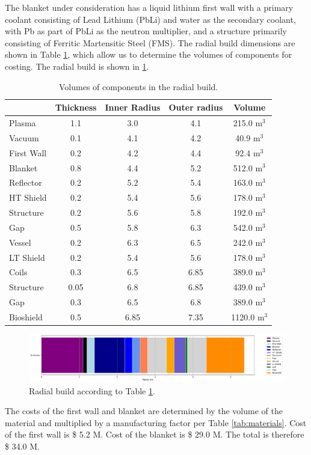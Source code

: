 The blanket under consideration has a liquid lithium first wall with a primary coolant consisting of Lead Lithium (PbLi) and water as the secondary coolant, with Pb as part of PbLi as the neutron multiplier, and a structure primarily consisting of Ferritic Martensitic Steel (FMS). The radial build dimensions are shown in Table \ref{tab:volumes}, which allow us to determine the volumes of components for costing.  The radial build is shown in \ref{fig:radial}.  \\


\begin{table}[h!]
    \centering
    \begin{tabular}{l c  c c c}
    \hline
        &	Thickness	&	Inner Radius	&	Outer radius	&	Volume		\\
        \hline
Plasma	&	1.1	&	3.0	&	4.1	&	215.0	m$^{3}$	\\
Vacuum	&	0.1	&	4.1	&	4.2	&	40.9	m$^{3}$	\\
First Wall	&	0.2	&	4.2	&	4.4	&	92.4	m$^{3}$	\\
Blanket	&	0.8	&	4.4	&	5.2	&	512.0	m$^{3}$	\\
Reflector	&	0.2	&	5.2	&	5.4	&	163.0	m$^{3}$	\\
HT Shield	&	0.2	&	5.4	&	5.6	&	178.0	m$^{3}$	\\
Structure	&	0.2	&	5.6	&	5.8	&	192.0	m$^{3}$	\\
Gap	&	0.5	&	5.8	&	6.3	&	542.0	m$^{3}$	\\
Vessel	&	0.2	&	6.3	&	6.5	&	242.0	m$^{3}$	\\
LT Shield	&	0.2	&	5.4	&	5.6	&	178.0	m$^{3}$	\\
Coils	&	0.3	&	6.5	&	6.85	&	389.0	m$^{3}$	\\
Structure	&	0.05	&	6.8	&	6.85	&	439.0	m$^{3}$	\\
Gap	&	0.3	&	6.5	&	6.8	&	389.0	m$^{3}$	\\
Bioshield	&	0.5	&	6.85	&	7.35	&	1120.0	m$^{3}$	\\

        \hline
    \end{tabular}
    \caption{Volumes of components in the radial build.}
    \label{tab:volumes}
\end{table}

\begin{figure}
    \centering
    \includegraphics[width=0.9\linewidth]{Figures/radial_build.pdf}
    \caption{Radial build according to Table \ref{tab:volumes}.}
    \label{fig:radial}
\end{figure}



The costs of the first wall and blanket are determined by the volume of the material and multiplied by a manufacturing factor per Table \ref{tab:materials}.   Cost of the first wall is \$ 5.2 M.  Cost of the blanket is \$ 29.0 M. The total is therefore \$ 34.0 M.

